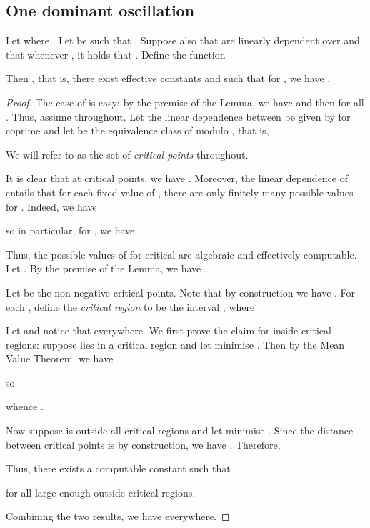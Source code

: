 \subsection{One dominant oscillation}\label{sec:oneOsc}



\begin{lemma}\label{lem: taylor}
Let  where . Let
 be such that 
. Suppose
also that  are linearly dependent over  and that
whenever , it holds that 
. Define the function

Then , that is, there exist effective constants
 and  such that for , we have .
\end{lemma}
\begin{proof}
The case of  is easy: by the premise of the Lemma, we
have  and then  for all .
Thus, assume  throughout.
Let the linear dependence between  be given by 
for  coprime and let
 be the equivalence class of  
modulo , that is,

We will refer to  as the set of \emph{critical points}
throughout. 

It is clear that at critical points, we have . Moreover, the linear dependence of 
entails that for each fixed value of ,
there are only finitely many possible values for .
Indeed, we have

so in particular, for , we have

Thus, the possible values of 
for  critical are algebraic and effectively computable.
Let .
By the premise of the Lemma, we have .

Let  be the non-negative critical points.
Note that by construction we have .
For each , define the \emph{critical region} to be the interval
, where


Let  and notice that 
everywhere. We first prove the claim for  inside critical
regions: suppose  lies in a critical region and let  minimise 
. Then by the Mean Value Theorem, we have 

so 

whence .


Now suppose  is outside all critical regions and let 
minimise . Since the distance between critical 
points is  by construction, we have . 
Therefore,

Thus, there exists a computable constant  such that 

for all large enough  outside critical regions.

Combining the two results, we have 
everywhere.
\end{proof}



